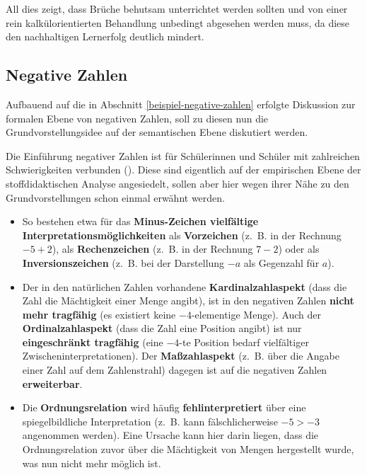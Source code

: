 \documentclass[
]{scrbook}
\providecommand{\tightlist}{%
  \setlength{\itemsep}{0pt}\setlength{\parskip}{0pt}}
\theoremstyle{definition}
\theoremstyle{definition}
\theoremstyle{definition}
\theoremstyle{definition}
\theoremstyle{remark}
\begin{document}
All dies zeigt, dass Brüche behutsam unterrichtet werden sollten und von einer rein kalkülorientierten Behandlung unbedingt abgesehen werden muss, da diese den nachhaltigen Lernerfolg deutlich mindert.

\subsection{Negative Zahlen}\label{negative-zahlen}

Aufbauend auf die in Abschnitt \ref{beispiel-negative-zahlen} erfolgte Diskussion zur \textcolor{formalColor}{formalen Ebene} von negativen Zahlen, soll zu diesen nun die Grundvorstellungsidee auf der \textcolor{semanticColor}{semantischen Ebene} diskutiert werden.

Die Einführung negativer Zahlen ist für Schülerinnen und Schüler mit zahlreichen Schwierigkeiten verbunden (). Diese sind eigentlich auf der \textcolor{empiricColor}{empirischen Ebene} der stoffdidaktischen Analyse angesiedelt, sollen aber hier wegen ihrer Nähe zu den Grundvorstellungen schon einmal erwähnt werden.

\begin{itemize}
\tightlist
\item
  So bestehen etwa für das \textbf{Minus-Zeichen vielfältige Interpretationsmöglichkeiten} als \textbf{Vorzeichen} (z.~B. in der Rechnung \(-5+2\)), als \textbf{Rechenzeichen} (z.~B. in der Rechnung \(7-2\)) oder als \textbf{Inversionszeichen} (z.~B. bei der Darstellung \(-a\) als Gegenzahl für \(a\)).
\item
  Der in den natürlichen Zahlen vorhandene \textbf{Kardinalzahlaspekt} (dass die Zahl die Mächtigkeit einer Menge angibt), ist in den negativen Zahlen \textbf{nicht mehr tragfähig} (es existiert keine \(-4\)-elementige Menge). Auch der \textbf{Ordinalzahlaspekt} (dass die Zahl eine Position angibt) ist nur \textbf{eingeschränkt tragfähig} (eine \(-4\)-te Position bedarf vielfältiger Zwischeninterpretationen). Der \textbf{Maßzahlaspekt} (z.~B. über die Angabe einer Zahl auf dem Zahlenstrahl) dagegen ist auf die negativen Zahlen \textbf{erweiterbar}.
\item
  Die \textbf{Ordnungsrelation} wird häufig \textbf{fehlinterpretiert} über eine spiegelbildliche Interpretation (z.~B. kann fälschlicherweise \(-5>-3\) angenommen werden). Eine Ursache kann hier darin liegen, dass die Ordnungsrelation zuvor über die Mächtigkeit von Mengen hergestellt wurde, was nun nicht mehr möglich ist.
\end{itemize}
\end{document}
